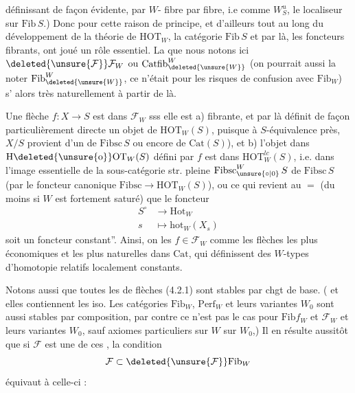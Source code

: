 définissant de façon évidente, par  $W$- fibre par fibre, i.e comme $W_S^u$,
le localiseur  sur $\mathrm{Fib}\,S$.) Donc pour cette
raison de principe, et d'ailleurs tout au
long du développement de la théorie
de $\mathrm{HOT}_W$, la catégorie $\mathrm{Fib}\,S$ et par là,
les foncteurs fibrants, ont joué un rôle
essentiel. La   que nous notons ici
$\deleted{\unsure{\mathcal F}}\mathcal F_W$ ou $\mathrm{Catfib}^{W}_{\deleted{\unsure{W}}}$ (on pourrait aussi la
noter $\mathrm{Fib}^{W}_{\deleted{\unsure{W}}}$,  ce n'était pour les risques
de confusion avec $\mathrm{Fib}_W$)  s'
alors très naturellement à partir de là.

Une flèche $f:X\longrightarrow S$ est dans $\mathcal F_W$ sss
elle est \quad a) fibrante, et par là définit
de façon particulièrement directe un objet
de $\mathrm{HOT}_W(S)$, puisque à $S$-équivalence près, $X/S$
provient d'un   de $\mathrm{Fibsc}\,S$ ou encore de $\mathrm{Cat}(S)$),
et \quad b) l'objet dans $\mathrm{H}\deleted{\unsure{\mathrm o}}\mathrm{OT}_W(S)$ défini par $f$ est
dans $\mathrm{HOT}^{lc}_W(S)$, i.e. dans l'image essentielle
de la sous-catégorie str. pleine $\mathrm{Fibsc}^{W}_{\unsure{\circ|0}}\,S$ de
$\mathrm{Fibsc}\,S$ (par le foncteur canonique 
$\mathrm{Fibsc}\longrightarrow\mathrm{HOT}_W(S)$), ou ce qui revient au
$=$ (du moins si $W$ est fortement saturé)
que le foncteur
\[
\begin{aligned}
S^{\circ}&\longrightarrow\mathrm{Hot}_W\\
s&\longmapsto\mathrm{hot}_W(X_s)
\end{aligned}
\]
soit  un foncteur  constant''. Ainsi,
on  les $f\in\mathcal F_W$ comme les
flèches les plus économiques et les plus
naturelles dans $\mathrm{Cat}$, qui définissent des
$W$-types d'homotopie relatifs localement constants.

Notons aussi que toutes les   de
flèches (4.2.1) sont stables par chgt de base.
( et elles contiennent les iso\unsure{)}. Les catégories
$\mathrm{Fib}_W$, $\mathrm{Perf}_W$ et leurs variantes $W_0$ sont aussi
stables par composition, par contre ce n'est
pas le cas pour $\mathrm{Fib}f_W$ et $\mathcal F_W$ et leurs
variantes $W_0$, sauf axiomes particuliers sur
$W$  sur $W_0$,) Il en résulte aussitôt
que si $\mathcal F$ est une de ces  , la
condition
\[
\mathcal F\subset\deleted{\unsure{\mathcal F}}\mathrm{Fib}_W
\]
équivaut à celle-ci :

